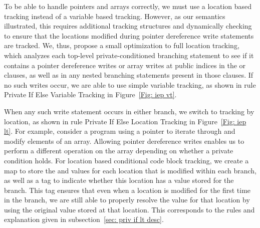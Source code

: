To be able to handle pointers and arrays correctly, 
we must use a location based tracking instead of a variable based tracking.  
However, as our semantics illustrated, this requires additional tracking structures and dynamically checking to ensure that the locations modified during pointer dereference write statements are tracked.  
We, thus, propose a small optimization to full location tracking, which analyzes each top-level private-conditioned branching statement to see if it contains a pointer dereference writes or array writes at public indices in the  or  clauses, as well as in any nested branching statements present in those clauses.
If no such writes occur, we are able to use simple variable tracking, as shown in rule Private If Else Variable Tracking in Figure~\ref{Fig: iep vt}. 


When any such write statement occurs in either branch, we switch to tracking by location, as shown in rule Private If Else Location Tracking in Figure~\ref{Fig: iep lt}. 
For example, consider a program using a pointer to iterate through and modify elements of an array. Allowing pointer dereference writes enables us to perform a different operation on the array depending on whether a private condition holds. 
For location based conditional code block tracking, we create a map to store the  and  values for each location that is modified within each branch, as well as a tag to indicate whether this location has a value stored for the  branch. 
This tag ensures that even when a location is modified for the first time in the  branch, we are still able to properly resolve the value for that location by using the original value stored at that location.  This corresponds to the rules and explanation given in subsection~\ref{sec: priv if lt desc}.


